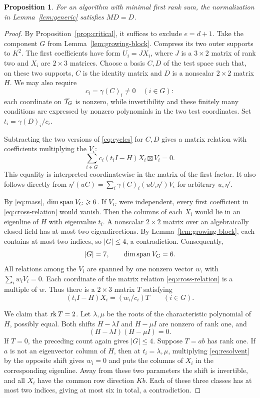 \documentclass[11pt,a4paper]{article}
\numberwithin{equation}{section}
\theoremstyle{plain}
\newtheorem{prop}[theorem]{Proposition}
\theoremstyle{definition}
\newcommand{\leqs}{\leqslant}\newcommand{\geqs}{\geqslant}
\begin{document}
\begin{prop}\label{prop:no-growth}
For an algorithm with minimal first rank sum, the normalization in
Lemma~\ref{lem:generic} satisfies $MD=D$.
\end{prop}
\begin{proof}
By Proposition~\ref{prop:critical}, it suffices to exclude $e=d+1$.
Take the component $G$ from Lemma~\ref{lem:growing-block}.
Compress its two outer supports to $K^2$. The first coefficients have
form $U_i=JX_i$, where $J$ is a $3\times2$ matrix of rank two and
$X_i$ are $2\times3$ matrices. Choose a basis $C,D$ of the test space
such that, on these two supports, $C$ is the identity matrix and
$D$ is a nonscalar $2\times2$ matrix $H$. We may also require
\[
 c_i=\gamma(C)_i\ne0\quad(i\in G):
\]
each coordinate on $\mathcal T_G$ is nonzero, while invertibility and
these finitely many conditions are expressed by nonzero polynomials
in the two test coordinates. Set $t_i=\gamma(D)_i/c_i$.

Subtracting the two versions of \eqref{eq:cycles} for $C,D$ gives
a matrix relation with coefficients multiplying the $V_i$:
\begin{equation}\label{eq:cross-relation}
 \sum_{i\in G} c_i(t_iI-H)X_i\boxtimes V_i=0.
\end{equation}
This equality is interpreted coordinatewise in the matrix of the
first factor. It also follows directly from
$\eta'(uC)=\sum_i\gamma(C)_i(uU_i\eta')V_i$ for arbitrary $u,\eta'$.

By \eqref{eq:mass}, $\dim\Span V_G\geqs6$.
If $V_G$ were independent, every first coefficient in
\eqref{eq:cross-relation} would vanish. Then the columns of each
$X_i$ would lie in an eigenline of $H$ with eigenvalue $t_i$.
A nonscalar $2\times2$ matrix over an algebraically closed field has
at most two eigendirections. By Lemma~\ref{lem:growing-block}, each
contains at most two indices, so $|G|\leqs4$, a contradiction.
Consequently,
\[
 |G|=7,\qquad \dim\operatorname{span} V_G=6.
\]
All relations among the $V_i$ are spanned by one nonzero vector $w$,
with $\sum_iw_iV_i=0$. Each coordinate of the matrix relation
\eqref{eq:cross-relation} is a multiple of $w$. Thus there is a
$2\times3$ matrix $T$ satisfying
\begin{equation}\label{eq:resolvent}
 (t_iI-H)X_i=(w_i/c_i)T\qquad(i\in G).
\end{equation}

We claim that $\operatorname{rk} T=2$. Let $\lambda,\mu$ be the roots of the
characteristic polynomial of $H$, possibly equal. Both shifts
$H-\lambda I$ and $H-\mu I$ are nonzero of rank one, and
\begin{equation}\label{eq:CH}
 (H-\lambda I)(H-\mu I)=0.
\end{equation}
If $T=0$, the preceding count again gives $|G|\leqs4$.
Suppose $T=ab$ has rank one. If $a$ is not an eigenvector column of
$H$, then at $t_i=\lambda,\mu$, multiplying \eqref{eq:resolvent} by
the opposite shift gives $w_i=0$ and puts the columns of $X_i$ in
the corresponding eigenline. Away from these two parameters the
shift is invertible, and all $X_i$ have the common row direction $Kb$.
Each of these three classes has at most two indices, giving at most
six in total, a contradiction.


\end{proof}
\end{document}
